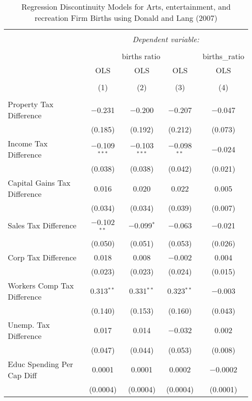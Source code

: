 
\begin{table}[!htbp] \centering 
  \caption{Regression Discontinuity Models for  Arts, entertainment, and recreation Firm Births using Donald and Lang (2007)} 
  \label{} 
\begin{tabular}{@{\extracolsep{5pt}}lcccc} 
\\[-1.8ex]\hline 
\hline \\[-1.8ex] 
 & \multicolumn{4}{c}{\textit{Dependent variable:}} \\ 
\cline{2-5} 
\\[-1.8ex] & \multicolumn{3}{c}{births ratio} & births\_ratio \\ 
 & OLS & OLS & OLS & OLS \\ 
\\[-1.8ex] & (1) & (2) & (3) & (4)\\ 
\hline \\[-1.8ex] 
 Property Tax Difference & $-$0.231 & $-$0.200 & $-$0.207 & $-$0.047 \\ 
  & (0.185) & (0.192) & (0.212) & (0.073) \\ 
  Income Tax Difference & $-$0.109$^{***}$ & $-$0.103$^{***}$ & $-$0.098$^{**}$ & $-$0.024 \\ 
  & (0.038) & (0.038) & (0.042) & (0.021) \\ 
  Capital Gains Tax Difference & 0.016 & 0.020 & 0.022 & 0.005 \\ 
  & (0.034) & (0.034) & (0.039) & (0.007) \\ 
  Sales Tax Difference & $-$0.102$^{**}$ & $-$0.099$^{*}$ & $-$0.063 & $-$0.021 \\ 
  & (0.050) & (0.051) & (0.053) & (0.026) \\ 
  Corp Tax Difference & 0.018 & 0.008 & $-$0.002 & 0.004 \\ 
  & (0.023) & (0.023) & (0.024) & (0.015) \\ 
  Workers Comp Tax Difference & 0.313$^{**}$ & 0.331$^{**}$ & 0.323$^{**}$ & $-$0.003 \\ 
  & (0.140) & (0.153) & (0.160) & (0.043) \\ 
  Unemp. Tax Difference & 0.017 & 0.014 & $-$0.032 & 0.002 \\ 
  & (0.047) & (0.044) & (0.053) & (0.008) \\ 
  Educ Spending Per Cap Diff & 0.0001 & 0.0001 & 0.0002 & $-$0.0002 \\ 
  & (0.0004) & (0.0004) & (0.0004) & (0.0001) \\ 

\end{tabular}
\end{table}

